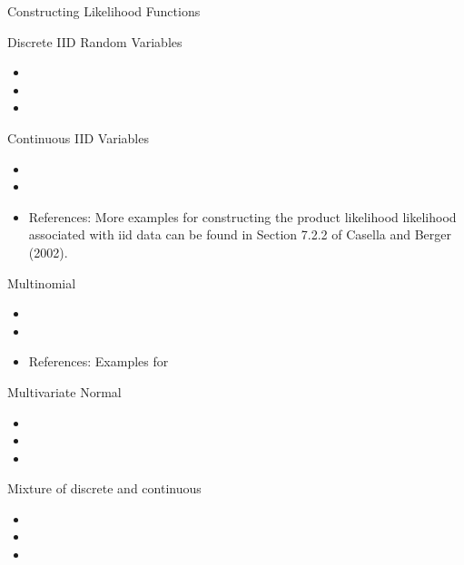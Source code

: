 \documentclass{beamer}
\begin{document}
\begin{section}{Constructing Likelihood Functions}  
    \begin{frame}{Discrete IID Random Variables}
        \begin{itemize}
            \item
            \item
            \item  
        \end{itemize}
    \end{frame}


    \begin{frame}{Continuous IID Variables}
        \begin{itemize}
            \item
            \item
            \item   References: More examples for constructing the product likelihood likelihood associated with iid data can be found in Section 7.2.2 of Casella and Berger (2002). 
        \end{itemize}
    \end{frame}



    \begin{frame}{Multinomial}
        \begin{itemize}
            \item
            \item
            \item  References: Examples for 
        \end{itemize}
    \end{frame}

    \begin{frame}{Multivariate Normal}
        \begin{itemize}
            \item
            \item
            \item 
        \end{itemize}
    \end{frame}



    \begin{frame}{Mixture of discrete and continuous}
        \begin{itemize}
            \item
            \item
            \item 
        \end{itemize}
    \end{frame}





\end{section}
\end{document}
